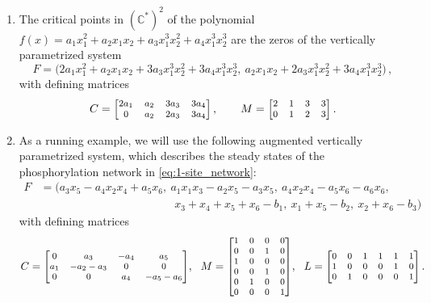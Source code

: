\documentclass[11pt,reqno,a4paper]{amsart}
\numberwithin{equation}{section}
\theoremstyle{theoremstyle}
\theoremstyle{examplestyle}
\newcommand{\CC}{\mathbb{C}}
\begin{document}
\begin{enumerate}[label=(\roman*)]
    \item The critical points in $(\CC^*)^2$ of the polynomial 
$f(x)=a_{1} x_{1}^2 + a_{2} x_{1} x_{2} + a_{3} x_{1}^3 x_{2}^2 + a_{4} x_{1}^3 x_{2}^3$
are the zeros of the vertically parametrized system
\begin{equation}
\label{eq:critical_point_system}
    F= \big(2 a _{1} x _{1}^2  + a _{2} x _{1} x _{2}+  3 a _{3} x _{1}^3 x _{2}^2 + 3 a _{4} x _{1}^3 x _{2}^3 ,\  
 a _{2} x _{1} x _{2}+ 2 a _{3} x _{1}^3 x _{2}^2+3 a _{4} x _{1}^3 x _{2}^3  \big)\,,
\end{equation}
with defining matrices
\[C={\footnotesize\begin{bmatrix}2a_1 & a_2 & 3a_3 & 3a_4\\ 0 & a_2 & 2a_3 & 3a_4 \end{bmatrix}}\,,\qquad M={\footnotesize\begin{bmatrix}2 & 1 & 3 & 3\\ 0 & 1 & 2 & 3 \end{bmatrix}}\,.\]
\item As a running example,  we will use the following augmented vertically parametrized system, which describes the steady states of the phosphorylation network in \eqref{eq:1-site_network}:
\begin{equation}\label{eq:1-site_equations}
\begin{aligned}
F & = \big(
a_{3} x_{5} - a_{4} x_{2} x_{4} + a_{5} x_{6}, \
a_{1} x_{1} x_{3} - a_{2} x_{5} - a_{3} x_{5}, \
a_{4} x_{2} x_{4} - a_{5} x_{6} - a_{6} x_{6},
\\  &  \hspace{5cm}
x_{3} + x_{4} + x_{5} + x_{6} - b_{1}, \
x_{1} + x_{5} - b_{2}, \ 
x_{2} + x_{6} - b_{3}\big)
\end{aligned}
\end{equation}
with defining matrices
\begin{equation}
\label{eq:minimal_presentation_1-site}
C ={\footnotesize \begin{bmatrix}0 & a_{3} & -a_{4} & a_{5}\\  a_{1} & -a_{2}-a_{3} & 0 & 0\\ 0 & 0 & a_{4} & -a_{5}-a_{6}\end{bmatrix}},
\:\:\:
M ={\footnotesize \begin{bmatrix}1 & 0 & 0 & 0\\ 0 & 0 & 1 & 0\\ 1 & 0 & 0 & 0\\ 0 & 0 & 1 & 0\\ 0 & 1 & 0 & 0\\  0 & 0 & 0 & 1\end{bmatrix}},
\:\:\:
L={\footnotesize\begin{bmatrix}0 & 0 & 1 & 1 & 1 & 1\\1 & 0 & 0 & 0 & 1 & 0\\0 & 1 & 0 & 0 & 0 & 1\end{bmatrix}}\, . 
\end{equation}
\end{enumerate}
\end{document}
